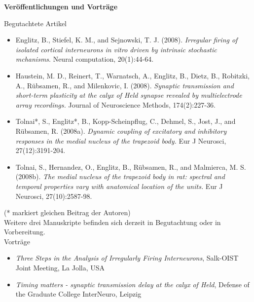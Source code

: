 \begin{center}
{\Large {\bf Ver\"offentlichungen und Vortr\"age}} \vspace{0.5cm}
\end{center}

{\large Begutachtete Artikel}

\begin{itemize}

\item Englitz, B., Stiefel, K. M., and Sejnowski,
 T. J. (2008). \emph{Irregular firing of isolated cortical
   interneurons in vitro driven by intrinsic stochastic mchanisms}. Neural computation, 20(1):44-64.

\item Haustein, M. D., Reinert, T., Warnatsch, A., Englitz, B., Dietz, B., Robitzki, A., R\"ubsamen, R., and Milenkovic, I. (2008). \emph{Synaptic transmission and short-term plasticity at the calyx of Held synapse revealed by multielectrode array recordings.} Journal of Neuroscience Methods, 174(2):227-36. 

\item Tolnai*, S., Englitz*, B., Kopp-Scheinpﬂug, C., Dehmel, S., Jost,
 J., and R\"ubsamen, R. (2008a). \emph{Dynamic coupling of excitatory and
 inhibitory responses in the medial nucleus of the trapezoid body.} Eur
 J Neurosci, 27(12):3191-204. 

\item Tolnai, S., Hernandez, O., Englitz, B., R\"ubsamen, R., and Malmierca, M. S. (2008b). \emph{The medial nucleus of the trapezoid body in rat: spectral and temporal properties vary with anatomical location of the units.} Eur J Neurosci, 27(10):2587-98.

\end{itemize}
(* markiert gleichen Beitrag der Autoren)\\[.25cm]
Weitere drei Manuskripte befinden sich derzeit in Begutachtung oder in Vorbereitung.\\[.25cm]


{\large Vortr\"age}

\begin{itemize}
 \item \emph{Three Steps in the Analysis of Irregularly Firing Interneurons}, Salk-OIST Joint Meeting, La Jolla, USA
 \item \emph{Timing matters - synaptic transmission delay at the calyx
    of Held}, Defense of the Graduate College InterNeuro, Leipzig
\end{itemize}


%
%

